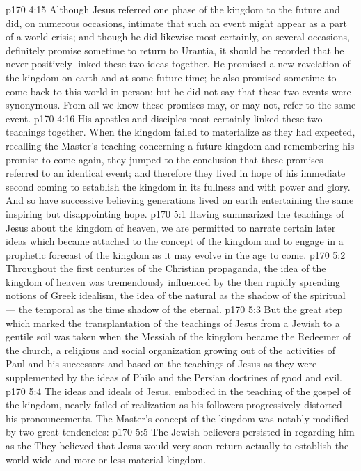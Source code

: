 \vs p170 4:15 Although Jesus referred one phase of the kingdom to the future and did, on numerous occasions, intimate that such an event might appear as a part of a world crisis; and though he did likewise most certainly, on several occasions, definitely promise sometime to return to Urantia, it should be recorded that he never positively linked these two ideas together. He promised a new revelation of the kingdom on earth and at some future time; he also promised sometime to come back to this world in person; but he did not say that these two events were synonymous. From all we know these promises may, or may not, refer to the same event.
\vs p170 4:16 His apostles and disciples most certainly linked these two teachings together. When the kingdom failed to materialize as they had expected, recalling the Master’s teaching concerning a future kingdom and remembering his promise to come again, they jumped to the conclusion that these promises referred to an identical event; and therefore they lived in hope of his immediate second coming to establish the kingdom in its fullness and with power and glory. And so have successive believing generations lived on earth entertaining the same inspiring but disappointing hope.
\vs p170 5:1 Having summarized the teachings of Jesus about the kingdom of heaven, we are permitted to narrate certain later ideas which became attached to the concept of the kingdom and to engage in a prophetic forecast of the kingdom as it may evolve in the age to come.
\vs p170 5:2 Throughout the first centuries of the Christian propaganda, the idea of the kingdom of heaven was tremendously influenced by the then rapidly spreading notions of Greek idealism, the idea of the natural as the shadow of the spiritual --- the temporal as the time shadow of the eternal.
\vs p170 5:3 But the great step which marked the transplantation of the teachings of Jesus from a Jewish to a gentile soil was taken when the Messiah of the kingdom became the Redeemer of the church, a religious and social organization growing out of the activities of Paul and his successors and based on the teachings of Jesus as they were supplemented by the ideas of Philo and the Persian doctrines of good and evil.
\vs p170 5:4 The ideas and ideals of Jesus, embodied in the teaching of the gospel of the kingdom, nearly failed of realization as his followers progressively distorted his pronouncements. The Master’s concept of the kingdom was notably modified by two great tendencies:
\vs p170 5:5 \bibnobreakspace The Jewish believers persisted in regarding him as the  They believed that Jesus would very soon return actually to establish the world\hyp{}wide and more or less material kingdom.
